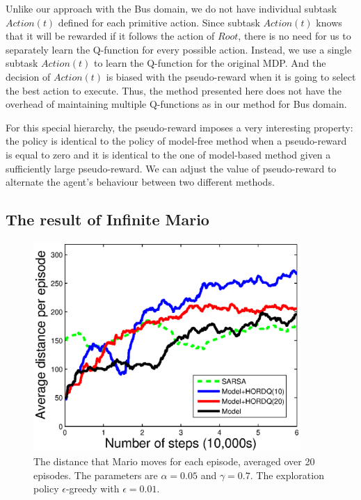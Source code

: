 Unlike our approach with the Bus domain, we do not have 
individual subtask $Action(t)$ defined for each primitive action. 
Since subtask $Action(t)$ knows that it will be rewarded if it follows 
the action of $Root$, there is no need for us to separately learn the Q-function for every possible action. 
Instead, we use a single subtask $Action(t)$ to learn the Q-function for the original MDP. 
And the decision of $Action(t)$ is biased with the pseudo-reward when it is going to select the best action to execute. 
Thus, the method presented here does not have the overhead of maintaining multiple Q-functions as in our method for Bus domain.


For this special hierarchy, the pseudo-reward imposes a very interesting property:
the policy is identical to the policy of model-free method when a pseudo-reward is equal to zero and
it is identical to the one of model-based method given a sufficiently large pseudo-reward.
We can adjust the value of pseudo-reward to alternate the agent's behaviour between
two different methods.


\subsection{The result of Infinite Mario}
\label{se:MarioRes}
\begin{figure}[t]
 \begin{minipage}[b]{1.0\linewidth}
    \begin{center}
    \includegraphics[width=4.0in] {./figures/1247.eps}
\end{center}
\end{minipage}

\caption{The distance that Mario moves for each episode, averaged over 20 episodes.
The parameters are $\alpha=0.05$ and $\gamma=0.7$. The exploration policy
$\epsilon$-greedy with $\epsilon = 0.01$.}
\label{fig:MarioExp}
\end{figure}


